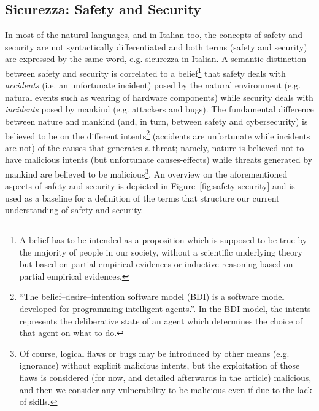 \subsection{Sicurezza: Safety and Security}\label{sec:sicurezza}
In most of the natural languages, and in Italian too, the concepts of safety
and security are not syntactically differentiated and both terms (safety and
security) are expressed by the same word, e.g. sicurezza in Italian.  A
semantic distinction between safety and security is correlated to a
belief\footnote{A belief has to be intended as a proposition which is supposed
to be true by the majority of people in our society, without a scientific
underlying theory but based on partial empirical evidences or inductive reasoning based on partial empirical evidences.} that
safety deals with \emph{accidents} (i.e. an unfortunate incident) posed by the
natural environment (e.g. natural events such as wearing of hardware
components) while security deals with \emph{incidents} posed by mankind (e.g.
attackers and bugs).  The fundamental difference between nature and mankind (and,
in turn, between safety and cybersecurity) is believed to be on the different
intents\footnote{``The belief–desire–intention software model (BDI) is a
software model developed for programming intelligent
agents.''\autocite{wiki-bdi}. In the BDI model, the intents represents the
deliberative state of an agent which determines the choice of that agent on
what to do.} (accidents are unfortunate while incidents are not) of the causes
that generates a threat; namely, nature is believed not to have malicious
intents (but unfortunate causes-effects) while threats generated by mankind are
believed to be malicious\footnote{Of course, logical flaws or bugs may be
introduced by other means (e.g. ignorance) without explicit malicious intents,
but the exploitation of those flaws is considered (for now, and detailed
afterwards in the article) malicious, and then we consider any vulnerability to
be malicious even if due to the lack of skills.}.
An overview on the aforementioned aspects of safety and security is depicted in
Figure~\ref{fig:safety-security} and is used as a baseline for a definition of
the terms that structure our current understanding of safety and security. 
